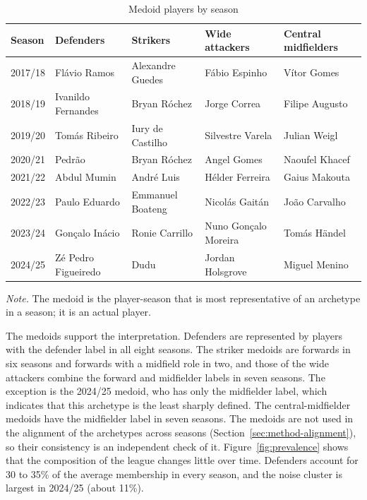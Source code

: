 \begin{table}[ht]
	\centering
	\small
	\caption{Medoid players by season}
	\label{tab:medoids}
	\begin{tabular}{lllll}
		\toprule
		Season & Defenders & Strikers & Wide attackers & Central midfielders \\
		\midrule
2017/18 & Flávio Ramos & Alexandre Guedes & Fábio Espinho & Vítor Gomes \\
2018/19 & Ivanildo Fernandes & Bryan Róchez & Jorge Correa & Filipe Augusto \\
2019/20 & Tomás Ribeiro & Iury de Castilho & Silvestre Varela & Julian Weigl \\
2020/21 & Pedrão & Bryan Róchez & Angel Gomes & Naoufel Khacef \\
2021/22 & Abdul Mumin & André Luis & Hélder Ferreira & Gaius Makouta \\
2022/23 & Paulo Eduardo & Emmanuel Boateng & Nicolás Gaitán & João Carvalho \\
2023/24 & Gonçalo Inácio & Ronie Carrillo & Nuno Gonçalo Moreira & Tomás Händel \\
2024/25 & Zé Pedro Figueiredo & Dudu & Jordan Holsgrove & Miguel Menino \\
		\bottomrule
	\end{tabular}
	\par\smallskip
	\parbox{0.95\textwidth}{\footnotesize\emph{Note.} The medoid is the player-season that is most representative of an archetype in a season; it is an actual player.}
\end{table}

The medoids support the interpretation. Defenders are represented by players with the defender label in all eight seasons. The striker medoids are forwards in six seasons and forwards with a midfield role in two, and those of the wide attackers combine the forward and midfielder labels in seven seasons. The exception is the 2024/25 medoid, who has only the midfielder label, which indicates that this archetype is the least sharply defined. The central-midfielder medoids have the midfielder label in seven seasons. The medoids are not used in the alignment of the archetypes across seasons (Section~\ref{sec:method-alignment}), so their consistency is an independent check of it. Figure~\ref{fig:prevalence} shows that the composition of the league changes little over time. Defenders account for 30 to 35\% of the average membership in every season, and the noise cluster is largest in 2024/25 (about 11\%).


